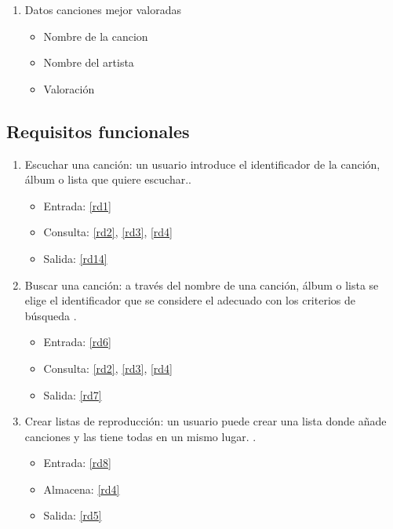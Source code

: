 \documentclass[12pt,a4paper]{article}
\begin{document}
\begin{enumerate}[label=\textnormal{RD\arabic*.}]
	\item Datos canciones mejor valoradas \label{rd39}
		\begin{itemize}
			\item Nombre de la cancion
			\item Nombre del artista
			\item Valoración
		\end{itemize}

\end{enumerate}


\subsection{Requisitos funcionales}

\begin{enumerate}[label=\textnormal{RF\arabic*.}]


    \item Escuchar una canción: un usuario introduce el identificador de la canción, álbum o lista que quiere escuchar.\label{rf1}.
    	\begin{itemize}
			\item Entrada: \ref{rd1}
			\item Consulta: \ref{rd2}, \ref{rd3}, \ref{rd4} 
			\item Salida: \ref{rd14}
		\end{itemize}
		
	 \item Buscar una canción: a través del nombre de una canción, álbum o lista se elige el identificador que se considere el adecuado con los criterios de búsqueda \label{rf2}.
    	\begin{itemize}
			\item Entrada: \ref{rd6}
			\item Consulta: \ref{rd2}, \ref{rd3}, \ref{rd4} 
			\item Salida: \ref{rd7}
		\end{itemize}

	 \item Crear listas de reproducción: un usuario puede crear una lista donde añade canciones y las tiene todas en un mismo lugar. \label{rf3}.
    	\begin{itemize}
			\item Entrada: \ref{rd8}
			\item Almacena: \ref{rd4}
			\item Salida: \ref{rd5}
		\end{itemize}


\end{enumerate}
\end{document}
